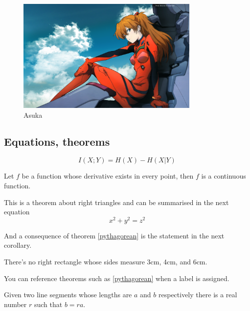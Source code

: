 \begin{figure}[H] %
    \centering
    \includegraphics[width=0.8\textwidth]{figure/asuka2.png}
    \caption{Asuka}
    \label{fig:Asuka}
\end{figure}


\subsection{Equations, theorems}

\begin{equation} \label{eq1}
    I(X;Y) = H(X) - H(X|Y)
\end{equation}


\begin{theorem}[Theorem 1]
Let \(f\) be a function whose derivative exists in every point, then \(f\) is 
a continuous function.
\end{theorem}

\begin{theorem}
\label{pythagorean}
This is a theorem about right triangles and can be summarised in the next 
equation 
\[ x^2 + y^2 = z^2 \]
\end{theorem}

And a consequence of theorem \ref{pythagorean} is the statement in the next 
corollary.

\begin{corollary}
There's no right rectangle whose sides measure 3cm, 4cm, and 6cm.
\end{corollary}

You can reference theorems such as \ref{pythagorean} when a label is assigned.

\begin{lemma}
Given two line segments whose lengths are \(a\) and \(b\) respectively there is a 
real number \(r\) such that \(b=ra\).
\end{lemma}

